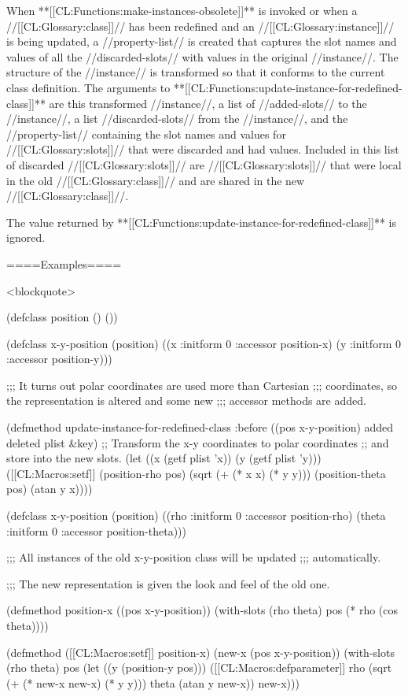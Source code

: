 When **[[CL:Functions:make-instances-obsolete]]** is invoked or when a //[[CL:Glossary:class]]// has been redefined and an //[[CL:Glossary:instance]]// is being updated, a //property-list// is created that captures the slot names and values of all the //discarded-slots// with values in the original //instance//. The structure of the //instance// is transformed so that it conforms to the current class definition. The arguments to **[[CL:Functions:update-instance-for-redefined-class]]** are this transformed //instance//, a list of //added-slots// to the //instance//, a list //discarded-slots// from the //instance//, and the //property-list// containing the slot names and values for //[[CL:Glossary:slots]]// that were discarded and had values. Included in this list of discarded //[[CL:Glossary:slots]]// are //[[CL:Glossary:slots]]// that were local in the old //[[CL:Glossary:class]]// and are shared in the new //[[CL:Glossary:class]]//.


The value returned by **[[CL:Functions:update-instance-for-redefined-class]]** is ignored.

====Examples====

<blockquote>

(defclass position () ())

(defclass x-y-position (position) ((x :initform 0 :accessor position-x) (y :initform 0 :accessor position-y)))

;;; It turns out polar coordinates are used more than Cartesian ;;; coordinates, so the representation is altered and some new ;;; accessor methods are added.

(defmethod update-instance-for-redefined-class :before ((pos x-y-position) added deleted plist &key) ;; Transform the x-y coordinates to polar coordinates ;; and store into the new slots. (let ((x (getf plist 'x)) (y (getf plist 'y))) ([[CL:Macros:setf]] (position-rho pos) (sqrt (+ (* x x) (* y y))) (position-theta pos) (atan y x))))

(defclass x-y-position (position) ((rho :initform 0 :accessor position-rho) (theta :initform 0 :accessor position-theta)))

;;; All instances of the old x-y-position class will be updated ;;; automatically.

;;; The new representation is given the look and feel of the old one.

(defmethod position-x ((pos x-y-position)) (with-slots (rho theta) pos (* rho (cos theta))))

(defmethod ([[CL:Macros:setf]] position-x) (new-x (pos x-y-position)) (with-slots (rho theta) pos (let ((y (position-y pos))) ([[CL:Macros:defparameter]] rho (sqrt (+ (* new-x new-x) (* y y))) theta (atan y new-x)) new-x)))

